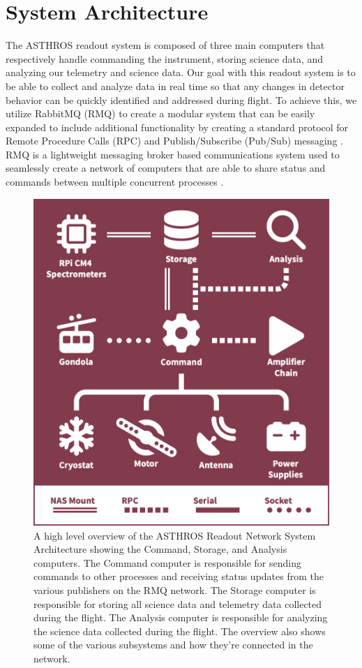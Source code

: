 \section{System Architecture}
\label{spectra/sec:system}
The ASTHROS readout system is composed of three main computers that respectively handle commanding the instrument, storing science data, and analyzing our telemetry and science data. 
Our goal with this readout system is to be able to collect and analyze data in real time so that any changes in detector behavior can be quickly identified and addressed during flight. 
To achieve this, we utilize RabbitMQ (RMQ) to create a modular system that can be easily expanded to include additional functionality by creating a standard protocol for Remote Procedure Calls (RPC) and Publish/Subscribe (Pub/Sub) messaging \parencite{dobbelaere2017kafkaversusrabbitmq}.
RMQ is a lightweight messaging broker based communications system used to seamlessly create a network of computers that are able to share status and commands between multiple concurrent processes \parencite{thompson2024architecture}.

\begin{figure}
    \centering
    \includegraphics[width=0.5\linewidth]{figs/spectra/system.png}
    \caption{A high level overview of the ASTHROS Readout Network System Architecture showing the Command, Storage, and Analysis computers. The Command computer is responsible for sending commands to other processes and receiving status updates from the various publishers on the RMQ network. The Storage computer is responsible for storing all science data and telemetry data collected during the flight. The Analysis computer is responsible for analyzing the science data collected during the flight. The overview also shows some of the various subsystems and how they're connected in the network.}
    \label{spectra/fig:system}
\end{figure}

